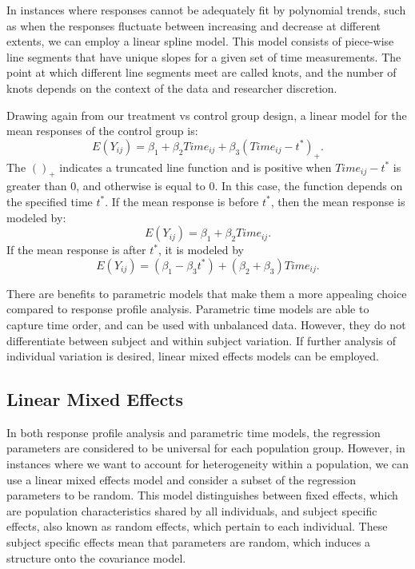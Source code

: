 \documentclass[12pt, twoside]{amherstthesis}
\begin{document}
In instances where responses cannot be adequately fit by polynomial trends, such as when the responses fluctuate between increasing and decrease at different extents, we can employ a linear spline model. This model consists of piece-wise line segments that have unique slopes for a given set of time measurements. The point at which different line segments meet are called knots, and the number of knots depends on the context of the data and researcher discretion.

Drawing again from our treatment vs control group design, a linear model for the mean responses of the control group is: \[E(Y_{ij}) = \beta_1 + \beta_2Time_{ij}+ \beta_3(Time_{ij}-t^*)_+.\] The \(()_+\) indicates a truncated line function and is positive when \(Time_{ij}-t^*\) is greater than 0, and otherwise is equal to 0. In this case, the function depends on the specified time \(t^*\). If the mean response is before \(t^*\), then the mean response is modeled by: \[E(Y_{ij}) = \beta_1 + \beta_2Time_{ij}.\] If the mean response is after \(t^*\), it is modeled by
\[E(Y_{ij}) = (\beta_1-\beta_3t^*) + (\beta_2+\beta_3)Time_{ij}.\]

There are benefits to parametric models that make them a more appealing choice compared to response profile analysis. Parametric time models are able to capture time order, and can be used with unbalanced data. However, they do not differentiate between subject and within subject variation. If further analysis of individual variation is desired, linear mixed effects models can be employed.

\hypertarget{linear-mixed-effects}{%
\subsection{Linear Mixed Effects}\label{linear-mixed-effects}}

In both response profile analysis and parametric time models, the regression parameters are considered to be universal for each population group. However, in instances where we want to account for heterogeneity within a population, we can use a linear mixed effects model and consider a subset of the regression parameters to be random. This model distinguishes between fixed effects, which are population characteristics shared by all individuals, and subject specific effects, also known as random effects, which pertain to each individual. These subject specific effects mean that parameters are random, which induces a structure onto the covariance model.
\end{document}
